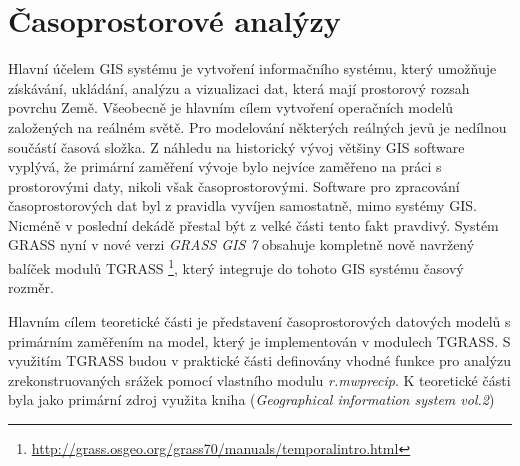\documentclass[a4paper,12pt,oneside]{report}
\begin{document}
\section{Časoprostorové analýzy}
Hlavní účelem GIS systému je  vytvoření informačního systému, který umožňuje získávání, ukládání, analýzu a vizualizaci dat, která mají prostorový rozsah povrchu Země. Všeobecně je hlavním cílem vytvoření operačních modelů založených na reálném světě. Pro modelování některých reálných jevů je nedílnou součástí časová složka. Z náhledu na historický vývoj většiny GIS software vyplývá, že primární zaměření vývoje bylo nejvíce zaměřeno na práci s prostorovými daty, nikoli však časoprostorovými. Software pro zpracování  časoprostorových dat byl z pravidla vyvíjen samostatně, mimo systémy GIS. Nicméně v poslední dekádě přestal být z velké části tento fakt pravdivý.\cite{geospatialanal} Systém GRASS nyní v nové verzi \textit{GRASS GIS 7 } obsahuje kompletně nově navržený balíček modulů TGRASS \footnote{\url{http://grass.osgeo.org/grass70/manuals/temporalintro.html}}, který integruje do tohoto GIS systému časový rozměr.

Hlavním cílem teoretické části je představení časoprostorových datových modelů s primárním zaměřením na model, který je implementován v  modulech TGRASS. S využitím TGRASS budou v praktické části definovány vhodné funkce pro analýzu zrekonstruovaných srážek pomocí vlastního modulu \textit{r.mwprecip}. K teoretické části byla jako primární zdroj využita kniha (\textit{Geographical information system vol.2})\cite{gistemporal}
\end{document}

